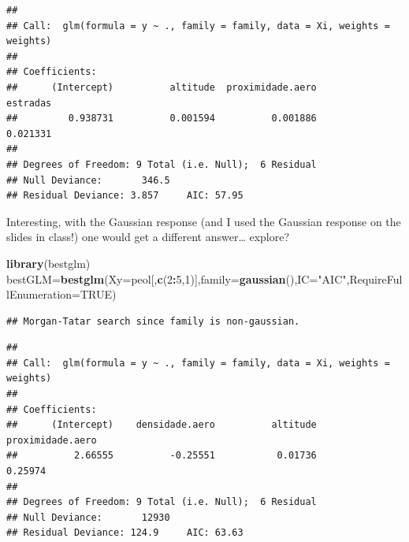 \documentclass[
]{book}
\newenvironment{Shaded}{\begin{snugshade}}{\end{snugshade}}
\newcommand{\AttributeTok}[1]{\textcolor[rgb]{0.13,0.29,0.53}{#1}}
\newcommand{\ConstantTok}[1]{\textcolor[rgb]{0.56,0.35,0.01}{#1}}
\newcommand{\DecValTok}[1]{\textcolor[rgb]{0.00,0.00,0.81}{#1}}
\newcommand{\FunctionTok}[1]{\textcolor[rgb]{0.13,0.29,0.53}{\textbf{#1}}}
\newcommand{\NormalTok}[1]{#1}
\newcommand{\OtherTok}[1]{\textcolor[rgb]{0.56,0.35,0.01}{#1}}
\newcommand{\SpecialCharTok}[1]{\textcolor[rgb]{0.81,0.36,0.00}{\textbf{#1}}}
\newcommand{\StringTok}[1]{\textcolor[rgb]{0.31,0.60,0.02}{#1}}
\begin{document}
\begin{Shaded}
\end{Shaded}

\begin{verbatim}
## 
## Call:  glm(formula = y ~ ., family = family, data = Xi, weights = weights)
## 
## Coefficients:
##      (Intercept)          altitude  proximidade.aero          estradas  
##         0.938731          0.001594          0.001886          0.021331  
## 
## Degrees of Freedom: 9 Total (i.e. Null);  6 Residual
## Null Deviance:       346.5 
## Residual Deviance: 3.857     AIC: 57.95
\end{verbatim}

Interesting, with the Gaussian response (and I used the Gaussian response on the slides in class!) one would get a different answer\ldots{} explore?

\begin{Shaded}
\begin{Highlighting}[]
\FunctionTok{library}\NormalTok{(bestglm)}
\NormalTok{bestGLM}\OtherTok{=}\FunctionTok{bestglm}\NormalTok{(}\AttributeTok{Xy=}\NormalTok{peol[,}\FunctionTok{c}\NormalTok{(}\DecValTok{2}\SpecialCharTok{:}\DecValTok{5}\NormalTok{,}\DecValTok{1}\NormalTok{)],}\AttributeTok{family=}\FunctionTok{gaussian}\NormalTok{(),}\AttributeTok{IC=}\StringTok{"AIC"}\NormalTok{,}\AttributeTok{RequireFullEnumeration=}\ConstantTok{TRUE}\NormalTok{)}
\end{Highlighting}
\end{Shaded}

\begin{verbatim}
## Morgan-Tatar search since family is non-gaussian.
\end{verbatim}

\begin{Shaded}
\end{Shaded}

\begin{verbatim}
## 
## Call:  glm(formula = y ~ ., family = family, data = Xi, weights = weights)
## 
## Coefficients:
##      (Intercept)    densidade.aero          altitude  proximidade.aero  
##          2.66555          -0.25551           0.01736           0.25974  
## 
## Degrees of Freedom: 9 Total (i.e. Null);  6 Residual
## Null Deviance:       12930 
## Residual Deviance: 124.9     AIC: 63.63
\end{verbatim}
\end{document}
